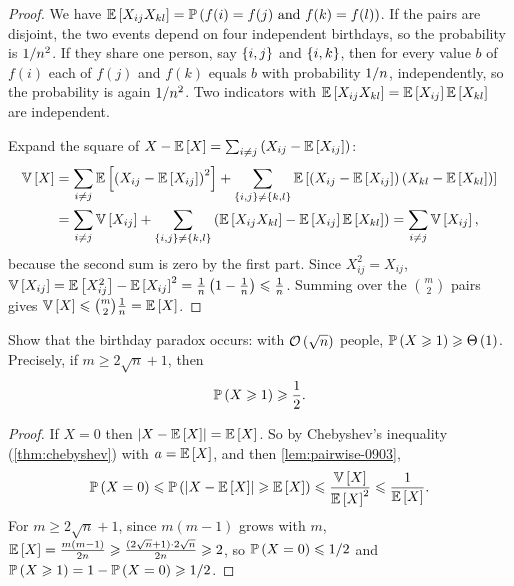 \begin{proof}
    We have $\operatorname{\mathbb{E}}\left[X_{ij} X_{kl}\right] = \operatorname{\mathbb{P}}\left(f(i) = f(j) \text{ and } f(k) = f(l)\right)$. If the
    pairs are disjoint, the two events depend on four independent birthdays, so the probability is
    $1/n^2$. If they share one person, say $\left\lbrace i,j\right\rbrace$ and $\left\lbrace i,k\right\rbrace$, then for every
    value $b$ of $f(i)$ each of $f(j)$ and $f(k)$ equals $b$ with probability $1/n$,
    independently, so the probability is again $1/n^2$. Two indicators with
    $\operatorname{\mathbb{E}}\left[X_{ij} X_{kl}\right] = \operatorname{\mathbb{E}}\left[X_{ij}\right] \operatorname{\mathbb{E}}\left[X_{kl}\right]$ are independent.

    Expand the square of
    $X - \operatorname{\mathbb{E}}\left[X\right] = \sum_{i \neq j} \left(X_{ij} - \operatorname{\mathbb{E}}\left[X_{ij}\right]\right)$:
    \begin{align*}
        \operatorname{\mathbb{V}}\left[X\right]
         & = \sum_{i \neq j} \operatorname{\mathbb{E}}\left[\left(X_{ij} - \operatorname{\mathbb{E}}\left[X_{ij}\right]\right)^2\right]
        + \sum_{\left\lbrace i,j\right\rbrace \neq \left\lbrace k,l\right\rbrace} \operatorname{\mathbb{E}}\left[\left(X_{ij} - \operatorname{\mathbb{E}}\left[X_{ij}\right]\right) \left(X_{kl} - \operatorname{\mathbb{E}}\left[X_{kl}\right]\right)\right] \\
         & = \sum_{i \neq j} \operatorname{\mathbb{V}}\left[X_{ij}\right]
        + \sum_{\left\lbrace i,j\right\rbrace \neq \left\lbrace k,l\right\rbrace} \left(\operatorname{\mathbb{E}}\left[X_{ij} X_{kl}\right] - \operatorname{\mathbb{E}}\left[X_{ij}\right] \operatorname{\mathbb{E}}\left[X_{kl}\right]\right)
        = \sum_{i \neq j} \operatorname{\mathbb{V}}\left[X_{ij}\right],
    \end{align*}
    because the second sum is zero by the first part. Since $X_{ij}^2 = X_{ij}$,
    $\operatorname{\mathbb{V}}\left[X_{ij}\right] = \operatorname{\mathbb{E}}\left[X_{ij}^2\right] - \operatorname{\mathbb{E}}\left[X_{ij}\right]^2
        = \frac{1}{n} \left(1 - \frac{1}{n}\right) \leqslant \frac{1}{n}$.
    Summing over the $\binom{m}{2}$ pairs gives
    $\operatorname{\mathbb{V}}\left[X\right] \leqslant \binom{m}{2} \frac{1}{n} = \operatorname{\mathbb{E}}\left[X\right]$.
\end{proof}

\begin{exercisebox}
\begin{exercise}\label{ex:birthday-0903}\label{thm:birthday-0903}
    Show that the birthday paradox occurs: with $\mathcal{O}\left(\sqrt{n}\right)$ people,
    $\operatorname{\mathbb{P}}\left(X \geqslant 1\right) \geqslant \Theta\left(1\right)$. Precisely, if $m \geq 2\sqrt{n} + 1$, then
    \[\operatorname{\mathbb{P}}\left(X \geqslant 1\right) \geqslant \frac{1}{2}.\]
\end{exercise}
\tcblower
\begin{proof}
    If $X = 0$ then $\left\lvert X - \operatorname{\mathbb{E}}\left[X\right]\right\rvert = \operatorname{\mathbb{E}}\left[X\right]$. So by Chebyshev's inequality
    (\cref{thm:chebyshev}) with $a = \operatorname{\mathbb{E}}\left[X\right]$, and then \cref{lem:pairwise-0903},
    \[\operatorname{\mathbb{P}}\left(X = 0\right) \leqslant \operatorname{\mathbb{P}}\left(\left\lvert X - \operatorname{\mathbb{E}}\left[X\right]\right\rvert \geqslant \operatorname{\mathbb{E}}\left[X\right]\right)
        \leqslant \frac{\operatorname{\mathbb{V}}\left[X\right]}{\operatorname{\mathbb{E}}\left[X\right]^2} \leqslant \frac{1}{\operatorname{\mathbb{E}}\left[X\right]}.\]
    For $m \geq 2\sqrt{n} + 1$, since $m(m-1)$ grows with $m$,
    $\operatorname{\mathbb{E}}\left[X\right] = \frac{m(m-1)}{2n} \geqslant \frac{(2\sqrt{n} + 1) \cdot 2\sqrt{n}}{2n} \geqslant 2$,
    so $\operatorname{\mathbb{P}}\left(X = 0\right) \leqslant 1/2$ and $\operatorname{\mathbb{P}}\left(X \geqslant 1\right) = 1 - \operatorname{\mathbb{P}}\left(X = 0\right) \geqslant 1/2$.
\end{proof}
\end{exercisebox}

